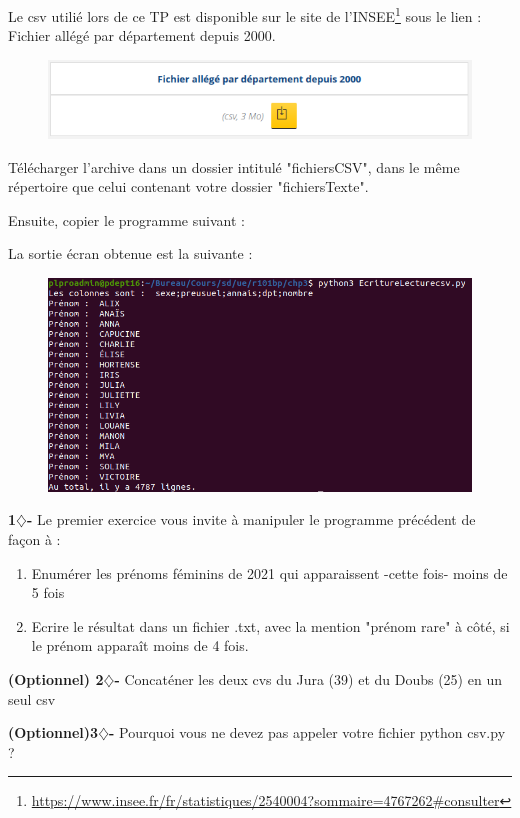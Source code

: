 Le csv utilié lors de ce TP est disponible sur le site de l'INSEE\footnote{\url{https://www.insee.fr/fr/statistiques/2540004?sommaire=4767262\#consulter}}
sous le lien : Fichier allégé par département depuis 2000. 


\begin{figure}[H]
    \centering
    \includegraphics[scale = 0.5]{chapitre3/figures/csvINSEE.png}
\end{figure}

Télécharger l'archive dans un dossier intitulé "fichiersCSV", dans le même répertoire que celui contenant votre dossier "fichiersTexte".


Ensuite, copier le programme suivant :



La sortie écran obtenue est la suivante : 

\begin{figure}[H]
    \centering
    \includegraphics[scale = 0.5]{chapitre3/figures/csvex.png}
\end{figure}


\begin{tcolorbox}[lefttitle=2cm, colframe=gray!75!black, title= \textbf{Exercices}]
\textbf{1$\diamondsuit$-}
Le premier exercice vous invite à manipuler le programme précédent de façon à :

\begin{enumerate}
    \item Enumérer les prénoms féminins de 2021 qui apparaissent -cette fois- moins de 5 fois 
    \item Ecrire le résultat dans un fichier .txt, avec la mention "prénom rare" à côté, si le prénom apparaît moins de 4 fois.
\end{enumerate}

\textbf{(Optionnel) 2$\diamondsuit$-} Concaténer les deux cvs du Jura (39) et du Doubs (25) en un seul csv

\textbf{(Optionnel)3$\diamondsuit$-} Pourquoi vous ne devez pas appeler votre fichier python csv.py ?
\end{tcolorbox}

